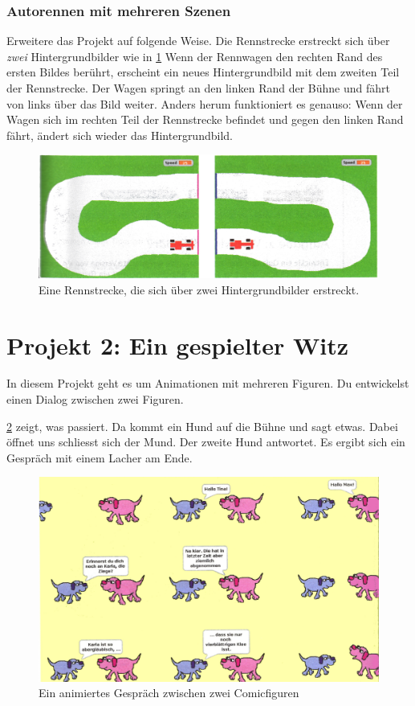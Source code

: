 \documentclass[12pt,a4paper,titlepage]{article}
\begin{document}
\subsubsection{Autorennen mit mehreren Szenen}

Erweitere das Projekt auf folgende Weise. Die Rennstrecke erstreckt sich über \textit{zwei} Hintergrundbilder wie in \cref{fig:erweiterung} Wenn der Rennwagen den rechten Rand des ersten Bildes berührt, erscheint ein neues Hintergrundbild mit dem zweiten Teil der Rennstrecke. Der Wagen springt an den linken Rand der Bühne und fährt von links über das Bild weiter. Anders herum funktioniert es genauso: Wenn der Wagen sich im rechten Teil der Rennstrecke befindet und gegen den linken Rand fährt, ändert sich wieder das Hintergrundbild.

\begin{figure}[H]
\centering
\includegraphics{rennbahn3.jpg}
\caption{Eine Rennstrecke, die sich über zwei Hintergrundbilder erstreckt.}
\label{fig:erweiterung}
\end{figure}

\section{Projekt 2: Ein gespielter Witz}
\label{sec:projekt2}

In diesem Projekt geht es um Animationen mit mehreren Figuren. Du entwickelst einen Dialog zwischen zwei Figuren.

\cref{fig:comic} zeigt, was passiert. Da kommt ein Hund auf die Bühne und sagt etwas. Dabei öffnet uns schliesst sich der Mund. Der zweite Hund antwortet. Es ergibt sich ein Gespräch mit einem Lacher am Ende.

\begin{figure}[H]
\centering
\includegraphics{comic.jpg}
\caption{Ein animiertes Gespräch zwischen zwei Comicfiguren}
\label{fig:comic}
\end{figure}
\end{document}
